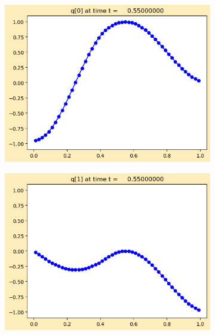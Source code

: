 \documentclass{article}
\begin{document}
\begin{figure}[H]
	\centering
	\begin{subfigure}{0.495\linewidth}
		\centering
		\includegraphics[width=\linewidth]{standing/_plots/frame0011fig0.png}
	\end{subfigure}
	\begin{subfigure}{0.495\linewidth}
		\centering
		\includegraphics[width=\linewidth]{standing/_plots/frame0011fig1.png}
	\end{subfigure}
	\centering
	\begin{subfigure}{0.495\linewidth}
		\centering

\end{subfigure}
\end{figure}
\end{document}
